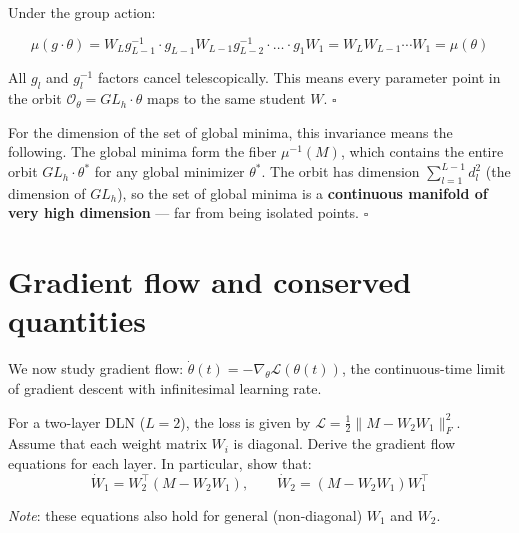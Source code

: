 \documentclass[11pt]{article}
\begin{document}
\begin{solution}[ex:td-1d]
Under the group action:

\[\mu(g \cdot \theta) = W_L g_{L-1}^{-1} \cdot g_{L-1} W_{L-1} g_{L-2}^{-1} \cdot \ldots \cdot g_1 W_1 = W_L W_{L-1} \cdots W_1 = \mu(\theta)\]

All \(g_l\) and \(g_l^{-1}\) factors cancel telescopically. This means
every parameter point in the orbit
\(\mathcal{O}_\theta = GL_h \cdot \theta\) maps to the same student
\(W\). \(\square\)

For the dimension of the set of global minima,
this invariance means the following. The global minima form the fiber
\(\mu^{-1}(M)\), which contains
the entire orbit \(GL_h \cdot \theta^*\) for any global minimizer
\(\theta^*\). The orbit has dimension \(\sum_{l=1}^{L-1} d_l^2\) (the
dimension of \(GL_h\)), so the set of global minima is a
\textbf{continuous manifold of very high dimension} --- far from being
isolated points. \(\square\)
\end{solution}

\section{Gradient flow and conserved quantities}
\label{sec:td-gradflow}

We now study gradient flow:
\(\dot{\theta}(t) = -\nabla_\theta \mathcal{L}(\theta(t))\), the
continuous-time limit of gradient descent with infinitesimal learning
rate.

\begin{exercise}
\label{ex:td-2a}
For a two-layer DLN (\(L=2\)), the loss is given by \(\mathcal{L} = \frac{1}{2}\|M - W_2 W_1\|_F^2\).
Assume that each weight matrix \(W_i\) is diagonal.
Derive the gradient flow equations for each layer.
In particular, show that:
\[\dot{W}_1 = W_2^\top(M - W_2 W_1), \qquad \dot{W}_2 = (M - W_2 W_1) W_1^\top\]

\emph{Note}: these equations also hold for general (non-diagonal)
\(W_1\) and \(W_2\).
\end{exercise}
\end{document}
